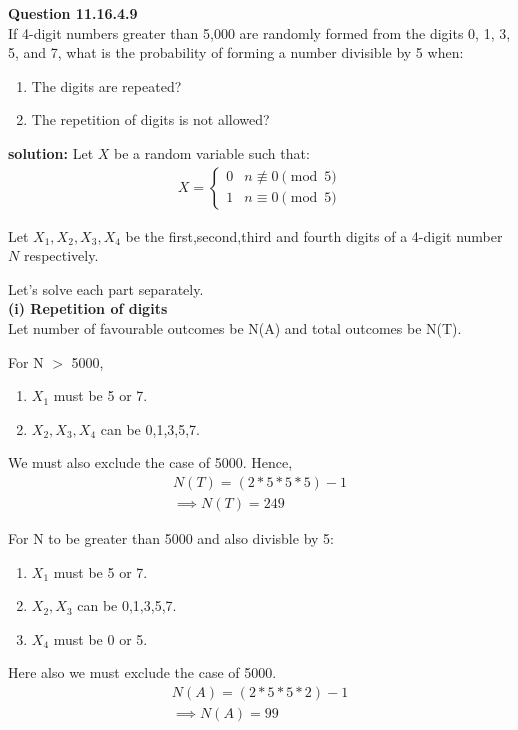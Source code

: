 \documentclass{article}
\begin{document}
\providecommand{\pr}[1]{\ensuremath{\Pr\left(#1\right)}}
\providecommand{\brak}[1]{\ensuremath{\left(#1\right)}}
\newcommand{\solution}{\noindent \textbf{solution: }}

\textbf{Question 11.16.4.9}\\
If 4-digit numbers greater than 5,000 are randomly formed from the digits 0, 1, 3, 5, and 7, what is the probability of forming a number divisible by 5 when:
\begin{enumerate}
    \item The digits are repeated?
    \item The repetition of digits is not allowed?
\end{enumerate}

\solution
Let $X$ be a random variable such that:
\begin{align}
	X = \begin{cases}
		0 & n \not\equiv 0 \pmod{5}\\
		1 & n \equiv 0 \pmod{5}\end{cases}
\end{align}

Let $X_{1},X_{2},X_{3},X_{4}$ be the first,second,third and fourth digits of a 4-digit number $N$ respectively.

Let's solve each part separately. \\

\textbf{(i) Repetition of digits}\\
Let number of favourable outcomes be N(A) and total outcomes be N(T).

For N $>$ 5000,
\begin{enumerate}
	\item $X_{1}$ must be 5 or 7.
	\item $X_{2},X_{3},X_{4}$ can be 0,1,3,5,7.
\end{enumerate}
We must also exclude the case of 5000.
Hence,
\begin{align}
	N(T)=(2*5*5*5)-1 \\
	\implies N(T)=249
\end{align}

For N to be greater than 5000 and also divisble by 5:
\begin{enumerate}
	\item $X_{1}$ must be 5 or 7.
	\item $X_{2},X_{3}$ can be 0,1,3,5,7.
	\item $X_{4}$ must be 0 or 5.
\end{enumerate}
Here also we must exclude the case of 5000.
\begin{align}
	N(A)=(2*5*5*2)-1 \\
	\implies N(A)=99
\end{align}
\end{document}
